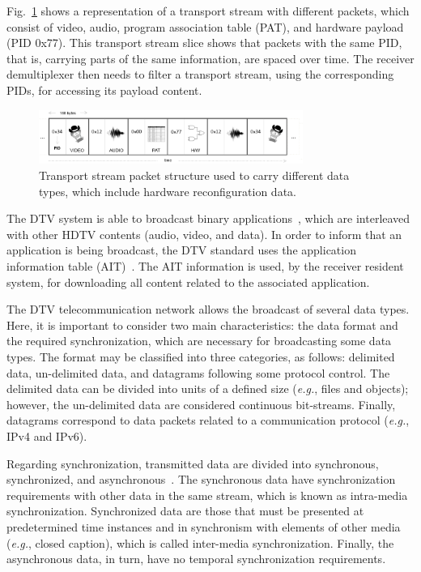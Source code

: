 Fig.~\ref{figure:fig2} shows a representation of a transport stream with different packets, which consist of video, audio, program association table (PAT), and hardware payload (PID 0x77). This transport stream slice shows that packets with the same PID, that is, carrying parts of the same information, are spaced over time. The receiver demultiplexer then needs to filter a transport stream, using the corresponding PIDs, for accessing its payload content.

%
\begin{figure}[ht]
\centering
\includegraphics[width=3.4in]{images/Fig2.eps}
\caption{Transport stream packet structure used to carry different data types, which include hardware reconfiguration data.}
\label{figure:fig2}
\end{figure}
%

The DTV system is able to broadcast binary applications~\cite{ref17}, which are interleaved with other HDTV contents (audio, video, and data). In order to inform that an application is being broadcast, the DTV standard uses the application information table (AIT)~\cite{ref18}. The AIT information is used, by the receiver resident system, for downloading all content related to the associated application.

The DTV telecommunication network allows the broadcast of several data types. Here, it is important to consider two main characteristics: the data format and the required synchronization, which are necessary for broadcasting some data types. The format may be classified into three categories, as follows: delimited data, un-delimited data, and datagrams following some protocol control. The delimited data can be divided into units of a defined size ({\em e.g.}, files and objects); however, the un-delimited data are considered continuous bit-streams. Finally, datagrams correspond to data packets related to a communication protocol ({\em e.g.}, IPv4 and IPv6).

Regarding synchronization, transmitted data are divided into synchronous, synchronized, and asynchronous~\cite{ref19}. The synchronous data have synchronization requirements with other data in the same stream, which is known as intra-media synchronization. Synchronized data are those that must be presented at predetermined time instances and in synchronism with elements of other media ({\em e.g.}, closed caption), which is called inter-media synchronization. Finally, the asynchronous data, in turn, have no temporal synchronization requirements. 

